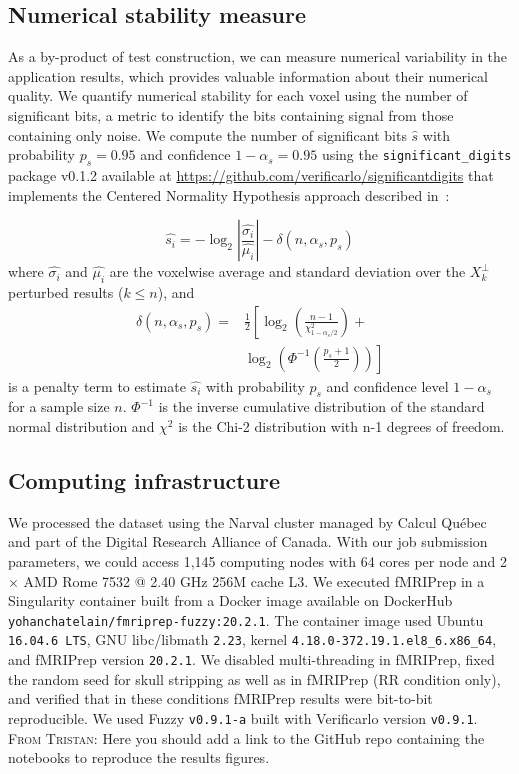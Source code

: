 \documentclass[lettersize,journal]{IEEEtran}
\newcommand{\TG}[1]{\color{orange}\textsc{From Tristan:} #1\color{black}\xspace}
\newcommand{\fmriprep}{fMRIPrep\xspace}
\begin{document}
\subsection{Numerical stability measure}

As a by-product of test construction, we can measure numerical variability in the application results, which provides valuable information about their numerical quality.
We quantify numerical stability for each voxel using the number of significant bits, a metric to identify the bits containing signal from those containing only noise. We compute the number of significant bits $\hat{s}$ with probability $p_s=0.95$ and confidence $1-\alpha_s=0.95$ using the \texttt{significant\_digits} package v0.1.2 available at \url{https://github.com/verificarlo/significantdigits} that implements the Centered Normality Hypothesis approach described in~\cite{sohier2021confidence}:

\[
  \hat{s_i} = -\log_2 \left| \frac{\hat{\sigma_i}}{\hat{\mu_i}} \right| - \delta(n, \alpha_s, p_s)
\]
where $\hat{\sigma_i}$ and $\hat{\mu_i}$ are the voxelwise average and standard deviation over the $X_k^\perp$ perturbed results ($k \leq n$), and
\begin{equation}
  \begin{split}
    \delta(n, \alpha_s, p_s) =& \frac{1}{2} \left[ \log_2 \left( \frac{n-1}{\chi^2_{1-\alpha_s/2}} \right) + \right. \\
      &  \left. \log_2 \left( \Phi^{-1} \left( \frac{p_s+1}{2} \right) \right) \right]
  \end{split}
\end{equation}
is a penalty term to estimate $\hat{s_i}$ with probability $p_s$ and confidence level $1-\alpha_s$ for a sample size $n$. $\Phi^{-1}$ is the inverse cumulative distribution of the standard normal distribution and $\chi^2$ is the Chi-2 distribution with n-1 degrees of freedom.

\subsection{Computing infrastructure}

We processed the dataset using the Narval cluster managed by Calcul Qu\'ebec and part of the Digital Research Alliance of Canada. With our job submission parameters, we could access 1,145 computing nodes with 64 cores per node and 2 $\times$ AMD Rome 7532 @ 2.40 GHz 256M cache L3. We executed \fmriprep in a Singularity container built from a Docker image available on DockerHub \texttt{yohanchatelain/fmriprep-fuzzy:20.2.1}. The container image used Ubuntu \texttt{16.04.6 LTS}, GNU libc/libmath \texttt{2.23}, kernel \texttt{4.18.0-372.19.1}\texttt{.el8\_6.x86\_64}, and fMRIPrep version \texttt{20.2.1}. We disabled multi-threading in fMRIPrep, fixed the random seed for skull stripping as well as in fMRIPrep (RR condition only), and verified that in these conditions fMRIPrep results were bit-to-bit reproducible.
We used Fuzzy \texttt{v0.9.1-a} built with Verificarlo version \texttt{v0.9.1}. \TG{Here you should add a link to the GitHub repo containing the notebooks to reproduce the results figures.}
\end{document}

